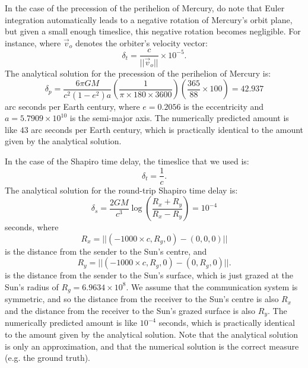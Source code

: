 \documentclass[12pt]{article}
\begin{document}
In the case of the precession of the perihelion of Mercury, do note that Euler integration automatically leads to a negative rotation of Mercury's orbit plane, but given a small enough timeslice, this negative rotation becomes negligible.
For instance, where $\vec{v}_{o}$ denotes the orbiter's velocity vector:
\begin{equation}
\label{dt_other}
\delta_{t} = \frac{c}{\lvert\lvert \vec{v}_{o} \rvert \rvert} \times 10^{-5}.
\end{equation}
The analytical solution for the precession of the perihelion of Mercury is:
\begin{equation}
\label{delta_p}
\delta_{p} = \frac{6 \pi G M}{c^2 (1 - e^2) a} \left( \frac{1}{ \pi \times 180 \times 3600} \right) \left( \frac{365}{88} \times 100 \right) = 42.937
\end{equation}
arc seconds per Earth century, where $e = 0.2056$ is the eccentricity and $a = 5.7909 \times 10^{10}$ is the semi-major axis.
The numerically predicted amount is like $43$ arc seconds per Earth century, which is practically identical to the amount given by the analytical solution.





In the case of the Shapiro time delay, the timeslice that we used is:
\begin{equation}
\label{dt_1_div_c}
\delta_{t} = \frac{1}{c}.
\end{equation}
The analytical solution for the round-trip Shapiro time delay is:
\begin{equation}
\label{delta_s}
\delta_{s} = \frac{2GM}{c^3} \log\left( \frac{R_x + R_y}{R_x - R_y} \right) = 10^{-4}
\end{equation}
seconds, where 
\begin{equation}
\label{r_x}
R_x = \lvert\lvert (-1000 \times c, R_g, 0) - (0, 0, 0) \rvert\rvert
\end{equation}
is the distance from the sender to the Sun's centre, and
\begin{equation}
\label{r_y}
R_y = \lvert\lvert (-1000 \times c, R_g, 0) - (0, R_g, 0) \rvert\rvert.
\end{equation}
is the distance from the sender to the Sun's surface, which is just grazed at the Sun's radius of $R_g = 6.9634 \times 10^8$.
We assume that the communication system is symmetric, and so the distance from the receiver to the Sun's centre is also $R_x$ and the distance from the receiver to the Sun's grazed surface is also $R_y$.
The numerically predicted amount is like $10^{-4}$ seconds, which is practically identical to the amount given by the analytical solution.
Note that the analytical solution is only an approximation, and that the numerical solution is the correct measure (e.g. the ground truth).
\end{document}
